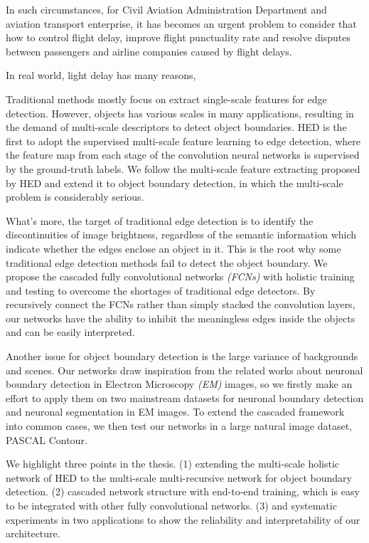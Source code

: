 \documentclass[senior]{IPSstyle}
\begin{document}
In such circumstances, for Civil Aviation Administration Department and aviation transport enterprise, it has becomes an urgent problem to consider that how to control flight delay, improve flight punctuality rate and resolve disputes between passengers and airline companies caused by flight delays.

In real world, light delay has many reasons,

Traditional methods mostly focus on extract single-scale features for edge detection\cite{Canny1986, Sobel2014, Dollar2013, Shen2015}. However, objects has various scales in many applications, resulting in the demand of multi-scale descriptors to detect object boundaries. HED\cite{Xie2015} is the first to adopt the supervised multi-scale feature learning to edge detection, where the feature map from each stage of the convolution neural networks is supervised by the ground-truth labels. We follow the multi-scale feature extracting proposed by HED\cite{Xie2015} and extend it to object boundary detection, in which the multi-scale problem is considerably serious.

What's more, the target of traditional edge detection is to identify the discontinuities of image brightness, regardless of the semantic information which indicate whether the edges enclose an object in it. This is the root why some traditional edge detection methods fail to detect the object boundary. We propose the cascaded fully convolutional networks \emph{(FCNs)}\cite{Long2015} with holistic training and testing to overcome the shortages of traditional edge detectors. By recursively connect the FCNs rather than simply stacked the convolution layers, our networks have the ability to inhibit the meaningless edges inside the objects and can be easily interpreted.

Another issue for object boundary detection is the large variance of backgrounds and scenes. Our networks draw inspiration from the related works about neuronal boundary detection in Electron Microscopy \emph{(EM)} images, so we firstly make an effort to apply them on two mainstream datasets for neuronal boundary detection and neuronal segmentation in EM images. To extend the cascaded framework into common cases, we then test our networks in a large natural image dataset, PASCAL Contour\cite{Yang2016}.

We highlight three points in the thesis. (1) extending the multi-scale holistic network of HED\cite{Xie2015} to the multi-scale multi-recursive network for object boundary detection. (2) cascaded network structure with end-to-end training, which is easy to be integrated with other fully convolutional networks. (3) and systematic experiments in two applications to show the reliability and interpretability of our architecture.
\end{document}
